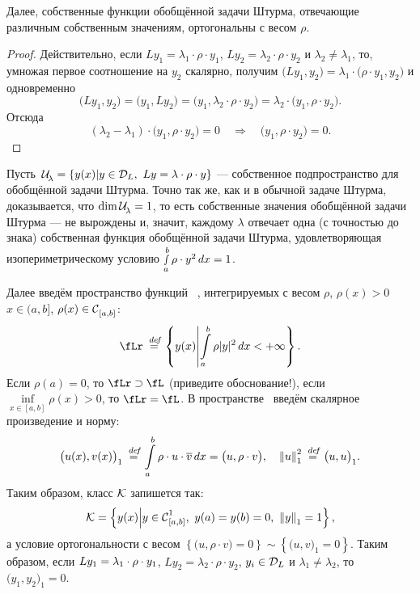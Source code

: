 Далее, собственные функции обобщённой задачи Штурма, отвечающие различным собственным значениям, ортогональны с весом $\rho$. 
\begin{proof}
	Действительно, если $Ly_1=\lambda_1\cdot\rho\cdot y_1$, $Ly_2=\lambda_2\cdot\rho\cdot y_2$ и $\lambda_2\neq\lambda_1$, то, умножая первое соотношение на $y_2$ скалярно, получим $\big(Ly_1,y_2\big)=\lambda_1\cdot\big(\rho\cdot y_1,y_2\big)$ и одновременно
	\begin{equation}
		\label{l8:eq:3}
		\big(Ly_1,y_2\big)=\big(y_1,Ly_2\big)=\big(y_1,\lambda_2\cdot\rho\cdot y_2\big)=\lambda_2\cdot\big(y_1,\rho\cdot y_2\big).
	\end{equation}	
	Отсюда
	\begin{equation}
		(\lambda_2-\lambda_1)\cdot\big(y_1,\rho\cdot y_2\big)=0\quad\Rightarrow\quad\big(y_1,\rho\cdot y_2\big)=0.
	\end{equation}
\end{proof}

Пусть\ $\Ul=\left\{y(x)\middle|y\in\mc{D}_L,\ Ly=\lambda\cdot\rho\cdot y\right\}$ --- собственное подпространство для обобщённой задачи Штурма. Точно так же, как и в обычной задаче Штурма, доказывается, что $\dim\Ul=1$, то есть собственные значения обобщённой задачи Штурма --- не вырождены и, значит, каждому $\lambda$ отвечает одна (с точностью до знака) собственная функция обобщённой задачи Штурма, удовлетворяющая изопериметрическому условию $\smallint\limits_a^b\rho\cdot y^2\,dx=1$.

Далее введём пространство функций \fLr\ {\mb,} интегрируемых с весом $\rho$, $\rho(x)>0$ $x\in(a,b]$, $\rho(x)\in\Cfn[{[a,b]}]{}$:
\begin{equation*}
	\fLr\eqdef\left\{y(x)\middle| \int\limits_a^b\rho|y|^2\,dx<+\infty\right\}.
\end{equation*}
Если $\rho(a)=0$, то $\fLr\supset\fL$ (приведите обоснование!), если $\displaystyle\inf\limits_{x\in[a,b]}\rho(x)>0$, то $\fLr\?=\fL$. В пространстве \fLr\ введём скалярное произведение и норму{\mb:}
\begin{equation*}
	\big(u(x),v(x)\big)_1\eqdef\int\limits_a^b\rho\cdot u\cdot\overline{v}\,dx=\big(u,\rho\cdot v\big),\quad{\norm{u}}_1^2\eqdef\big(u,u\big)_1.
\end{equation*}
Таким образом{\mb,} класс $\K$ запишется так:
\begin{equation*}
	\K=\left\{y(x)\middle|y\in\Cfn[{[a,b]}]{1},\ y(a)=y(b)=0,\ \norm{y}_1=1\right\},
\end{equation*}
а условие ортогональности с весом $\left\{\big(u,\rho\cdot v\big)=0\right\}\sim\left\{\big(u,v\big)_1=0\right\}$. Таким образом, если $Ly_1\?=\lambda_1\cdot\rho\cdot y_1$, $Ly_2=\lambda_2\cdot\rho\cdot y_2$, $y_i\in\mc{D}_L$ и $\lambda_1\neq\lambda_2$, то $\big(y_1,y_2\big)_1=0$.

